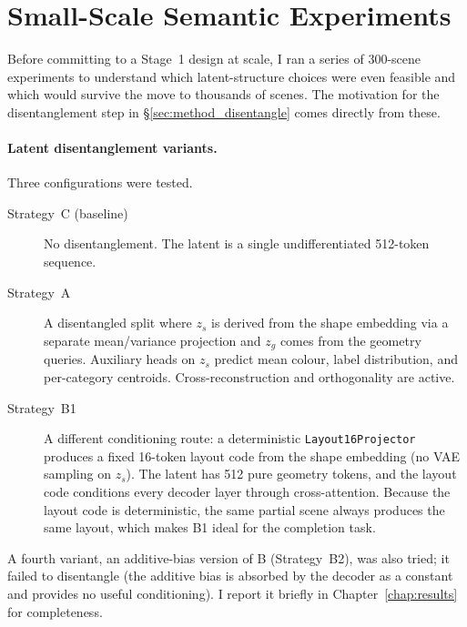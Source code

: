 \section{Small-Scale Semantic Experiments}
\label{sec:method_semantic}

Before committing to a Stage~1 design at scale, I ran a series of 300-scene experiments to understand which latent-structure choices were even feasible and which would survive the move to thousands of scenes. The motivation for the disentanglement step in \S\ref{sec:method_disentangle} comes directly from these.

\paragraph{Latent disentanglement variants.} Three configurations were tested.
\begin{description}
\item[Strategy~C (baseline)] No disentanglement. The latent is a single undifferentiated 512-token sequence.
\item[Strategy~A] A disentangled split where $z_s$ is derived from the shape embedding via a separate mean/variance projection and $z_g$ comes from the geometry queries. Auxiliary heads on $z_s$ predict mean colour, label distribution, and per-category centroids. Cross-reconstruction and orthogonality are active.
\item[Strategy~B1] A different conditioning route: a deterministic \texttt{Layout16Projector} produces a fixed 16-token layout code from the shape embedding (no VAE sampling on $z_s$). The latent has 512 pure geometry tokens, and the layout code conditions every decoder layer through cross-attention. Because the layout code is deterministic, the same partial scene always produces the same layout, which makes B1 ideal for the completion task.
\end{description}
A fourth variant, an additive-bias version of B (Strategy~B2), was also tried; it failed to disentangle (the additive bias is absorbed by the decoder as a constant and provides no useful conditioning). I report it briefly in Chapter~\ref{chap:results} for completeness.

